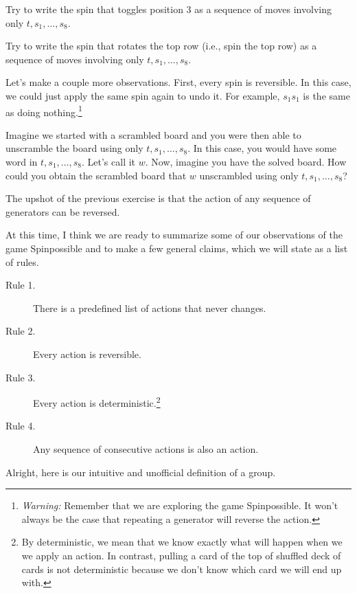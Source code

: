 \begin{exercise}
Try to write the spin that toggles position 3 as a sequence of moves involving only $t, s_1, \ldots, s_8$.
\end{exercise}

\begin{exercise}
Try to write the spin that rotates the top row (i.e., spin the top row) as a sequence of moves involving only $t, s_1, \ldots, s_8$.
\end{exercise}

Let's make a couple more observations.  First, every spin is reversible.  In this case, we could just apply the same spin again to undo it.  For example, $s_1s_1$ is the same as doing nothing.\footnote{\emph{Warning:} Remember that we are exploring the game Spinpossible.  It won't always be the case that repeating a generator will reverse the action.}

\begin{exercise}
Imagine we started with a scrambled board and you were then able to unscramble the board using only $t, s_1, \ldots, s_8$.  In this case, you would have some word in $t, s_1, \ldots, s_8$. Let's call it $w$.  Now, imagine you have the solved board.  How could you obtain the scrambled board that $w$ unscrambled using only $t, s_1,\ldots, s_8$?
\end{exercise}

The upshot of the previous exercise is that the action of any sequence of generators can be reversed.

At this time, I think we are ready to summarize some of our observations of the game Spinpossible and to make a few general claims, which we will state as a list of rules.

\begin{description}
\item[Rule 1.] There is a predefined list of actions that never changes.
\item[Rule 2.] Every action is reversible.
\item[Rule 3.] Every action is deterministic.\footnote{By deterministic, we mean that we know exactly what will happen when we we apply an action.  In contrast, pulling a card of the top of shuffled deck of cards is not deterministic because we don't know which card we will end up with.}
\item[Rule 4.] Any sequence of consecutive actions is also an action.
\end{description}

Alright, here is our intuitive and unofficial definition of a group.

